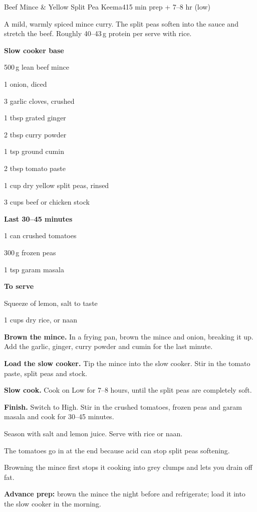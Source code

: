 \begin{recipebox}{Beef Mince \& Yellow Split Pea Keema}{4}{15 min prep + 7--8 hr (low)}

A mild, warmly spiced mince curry. The split peas soften into the sauce and
stretch the beef. Roughly 40--43\,g protein per serve with rice.

\begin{ingredients}
  \item[] \textbf{Slow cooker base}
  \item 500\,g lean beef mince
  \item 1 onion, diced
  \item 3 garlic cloves, crushed
  \item 1 tbsp grated ginger
  \item 2 tbsp curry powder
  \item 1 tsp ground cumin
  \item 2 tbsp tomato paste
  \item 1 cup dry yellow split peas, rinsed
  \item 3 cups beef or chicken stock
  \item[] \textbf{Last 30--45 minutes}
  \item 1 can crushed tomatoes
  \item 300\,g frozen peas
  \item 1 tsp garam masala
  \item[] \textbf{To serve}
  \item Squeeze of lemon, salt to taste
  \item 1 cups dry rice, or naan
\end{ingredients}

\begin{method}
  \item \textbf{Brown the mince.} In a frying pan, brown the mince and onion, breaking it up. Add the garlic, ginger, curry powder and cumin for the last minute.
  \item \textbf{Load the slow cooker.} Tip the mince into the slow cooker. Stir in the tomato paste, split peas and stock.
  \item \textbf{Slow cook.} Cook on Low for 7--8 hours, until the split peas are completely soft.
  \item \textbf{Finish.} Switch to High. Stir in the crushed tomatoes, frozen peas and garam masala and cook for 30--45 minutes.
  \item Season with salt and lemon juice. Serve with rice or naan.
\end{method}

\begin{notelist}
  \item The tomatoes go in at the end because acid can stop split peas softening.
  \item Browning the mince first stops it cooking into grey clumps and lets you drain off fat.
  \item \textbf{Advance prep:} brown the mince the night before and refrigerate; load it into the slow cooker in the morning.
\end{notelist}

\end{recipebox}
